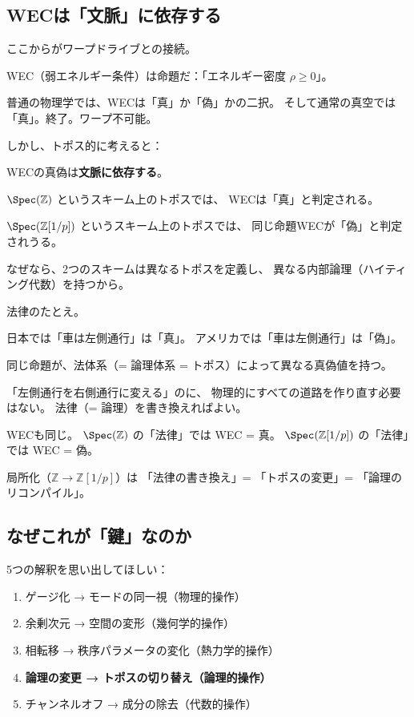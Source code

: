 \documentclass[12pt,a4paper]{article}
\begin{document}
\subsection{WECは「文脈」に依存する}

ここからがワープドライブとの接続。

WEC（弱エネルギー条件）は命題だ：「エネルギー密度 $\rho \geq 0$」。

\begin{problembox}
普通の物理学では、WECは「真」か「偽」かの二択。
そして通常の真空では「真」。終了。ワープ不可能。
\end{problembox}

しかし、トポス的に考えると：

\begin{keybox}[トポス的WEC]
WECの真偽は\textbf{文脈に依存する}。

$\Spec(\mathbb{Z})$ というスキーム上のトポスでは、
WECは「真」と判定される。

$\Spec(\mathbb{Z}[1/p])$ というスキーム上のトポスでは、
同じ命題WECが「偽」と判定されうる。

なぜなら、2つのスキームは異なるトポスを定義し、
異なる内部論理（ハイティング代数）を持つから。
\end{keybox}

\begin{analogybox}
法律のたとえ。

日本では「車は左側通行」は「真」。
アメリカでは「車は左側通行」は「偽」。

同じ命題が、法体系（= 論理体系 = トポス）によって異なる真偽値を持つ。

「左側通行を右側通行に変える」のに、
物理的にすべての道路を作り直す必要はない。
法律（= 論理）を書き換えればよい。

WECも同じ。
$\Spec(\mathbb{Z})$ の「法律」では WEC = 真。
$\Spec(\mathbb{Z}[1/p])$ の「法律」では WEC = 偽。

局所化（$\mathbb{Z} \to \mathbb{Z}[1/p]$）は
「法律の書き換え」= 「トポスの変更」= 「論理のリコンパイル」。
\end{analogybox}

\subsection{なぜこれが「鍵」なのか}

5つの解釈を思い出してほしい：
\begin{enumerate}
\item ゲージ化 → モードの同一視（物理的操作）
\item 余剰次元 → 空間の変形（幾何学的操作）
\item 相転移 → 秩序パラメータの変化（熱力学的操作）
\item \textbf{論理の変更 → トポスの切り替え（論理的操作）}
\item チャンネルオフ → 成分の除去（代数的操作）
\end{enumerate}
\end{document}
